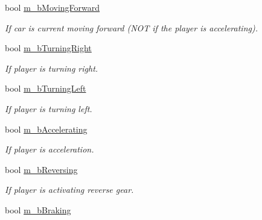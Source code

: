 \begin{DoxyCompactItemize}
\item 
\hypertarget{class_car_a7f45340643c43ddd543d96662fe88911}{}bool \hyperlink{class_car_a7f45340643c43ddd543d96662fe88911}{m\+\_\+b\+Moving\+Forward}\label{class_car_a7f45340643c43ddd543d96662fe88911}

\begin{DoxyCompactList}\small\item\em If car is current moving forward (N\+O\+T if the player is accelerating). \end{DoxyCompactList}\item 
\hypertarget{class_car_a1caa04bed661507cc92dcc465374aa40}{}bool \hyperlink{class_car_a1caa04bed661507cc92dcc465374aa40}{m\+\_\+b\+Turning\+Right}\label{class_car_a1caa04bed661507cc92dcc465374aa40}

\begin{DoxyCompactList}\small\item\em If player is turning right. \end{DoxyCompactList}\item 
\hypertarget{class_car_ab15cb88a73253d2d258368bed12be6cc}{}bool \hyperlink{class_car_ab15cb88a73253d2d258368bed12be6cc}{m\+\_\+b\+Turning\+Left}\label{class_car_ab15cb88a73253d2d258368bed12be6cc}

\begin{DoxyCompactList}\small\item\em If player is turning left. \end{DoxyCompactList}\item 
\hypertarget{class_car_a3ca299e37b7a2b964e68877e7fc41d56}{}bool \hyperlink{class_car_a3ca299e37b7a2b964e68877e7fc41d56}{m\+\_\+b\+Accelerating}\label{class_car_a3ca299e37b7a2b964e68877e7fc41d56}

\begin{DoxyCompactList}\small\item\em If player is acceleration. \end{DoxyCompactList}\item 
\hypertarget{class_car_a8a5ba2979820d7c0f2a00571fd7755de}{}bool \hyperlink{class_car_a8a5ba2979820d7c0f2a00571fd7755de}{m\+\_\+b\+Reversing}\label{class_car_a8a5ba2979820d7c0f2a00571fd7755de}

\begin{DoxyCompactList}\small\item\em If player is activating reverse gear. \end{DoxyCompactList}\item 
\hypertarget{class_car_a0a5b2769f8000bc41da5ffacaff488bd}{}bool \hyperlink{class_car_a0a5b2769f8000bc41da5ffacaff488bd}{m\+\_\+b\+Braking}\label{class_car_a0a5b2769f8000bc41da5ffacaff488bd}


\end{DoxyCompactItemize}
